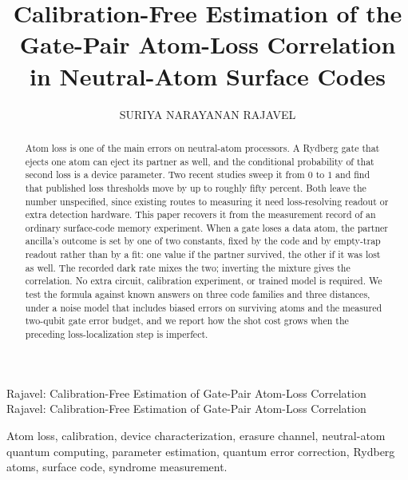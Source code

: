 \documentclass{ieeeaccess}
\begin{document}

\title{Calibration-Free Estimation of the Gate-Pair Atom-Loss Correlation in
Neutral-Atom Surface Codes}

\author{\uppercase{Suriya Narayanan Rajavel}}
\address[1]{Department of Applied Data Science, University of Florida, Gainesville, FL 32611 USA (email: suriyarajavel02@gmail.com)}

\markboth
{Rajavel: Calibration-Free Estimation of Gate-Pair Atom-Loss Correlation}
{Rajavel: Calibration-Free Estimation of Gate-Pair Atom-Loss Correlation}


\begin{abstract}
Atom loss is one of the main errors on neutral-atom processors. A Rydberg gate
that ejects one atom can eject its partner as well, and the conditional
probability of that second loss is a device parameter. Two recent studies sweep
it from $0$ to $1$ and find that published loss thresholds move by up to roughly fifty
percent. Both leave the number unspecified, since existing routes to measuring it need
loss-resolving readout or extra detection hardware. This paper recovers it
from the measurement record of an ordinary surface-code memory experiment.
When a gate loses a data atom, the partner ancilla's outcome is set by one of
two constants, fixed by the code and by empty-trap readout rather than by a
fit: one value if the partner survived, the other if it was lost as well. The
recorded dark rate mixes the two; inverting the mixture gives the correlation. No extra circuit, calibration experiment, or trained model is
required. We test the formula against known answers on three code families and
three distances, under a noise model that includes biased errors on surviving atoms and the measured
two-qubit gate error budget, and we report how the shot cost grows when the
preceding loss-localization step is imperfect.
\end{abstract}

\begin{keywords}
Atom loss, calibration, device characterization, erasure channel, neutral-atom
quantum computing, parameter estimation, quantum error correction, Rydberg atoms,
surface code, syndrome measurement.
\end{keywords}
\end{document}
